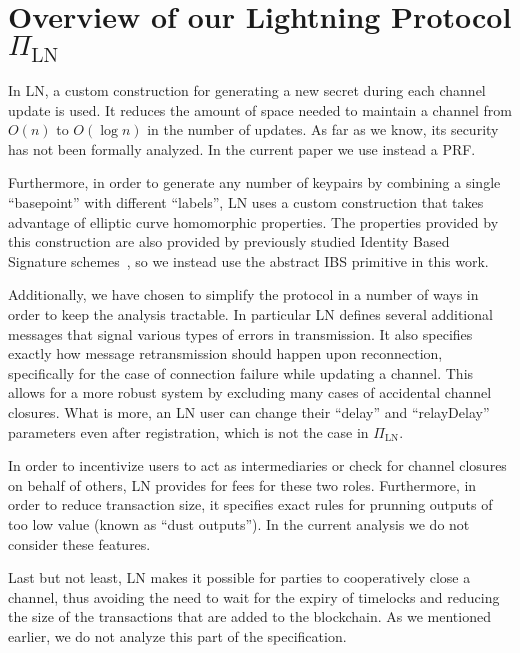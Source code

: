 \section{Overview of our Lightning Protocol $\Pi_{\mathrm{LN}}$}

  \begin{remark}

    In LN, a custom construction for generating a new secret during each channel
    update is used. It reduces the amount of space needed to maintain a channel
    from $O(n)$ to $O(\log n)$ in the number of updates. As far as we know, its
    security has not been formally analyzed. In the current paper we use instead
    a PRF.

    Furthermore, in order to generate any number of keypairs by combining a
    single ``basepoint'' with different ``labels'', LN uses a custom
    construction that takes advantage of elliptic curve homomorphic properties.
    The properties provided by this construction are also provided by previously
    studied Identity Based Signature schemes~\cite{ibsshamir,ibspaterson}, so we
    instead use the abstract IBS primitive in this work. 

    Additionally, we have chosen to simplify the protocol in a number of ways in
    order to keep the analysis tractable. In particular LN defines several
    additional messages that signal various types of errors in transmission. It
    also specifies exactly how message retransmission should happen upon
    reconnection, specifically for the case of connection failure while updating
    a channel. This allows for a more robust system by excluding many cases of
    accidental channel closures. What is more, an LN user can change their
    ``delay'' and ``relayDelay'' parameters even after registration, which is
    not the case in $\Pi_{\mathrm{LN}}$.

    In order to incentivize users to act as intermediaries or check for channel
    closures on behalf of others, LN provides for fees for these two roles.
    Furthermore, in order to reduce transaction size, it specifies exact rules
    for prunning outputs of too low value (known as ``dust outputs''). In the
    current analysis we do not consider these features.

    Last but not least, LN makes it possible for parties to cooperatively close
    a channel, thus avoiding the need to wait for the expiry of timelocks and
    reducing the size of the transactions that are added to the blockchain. As
    we mentioned earlier, we do not analyze this part of the specification.
  \end{remark}
